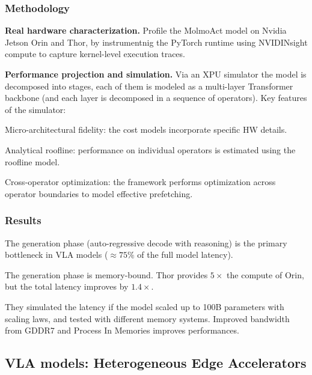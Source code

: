 \subsubsection{Methodology}
\begin{dashlist}
    \item \textbf{Real hardware characterization.} Profile the MolmoAct model on Nvidia Jetson Orin and Thor, by instrumentnig the PyTorch runtime using NVIDINsight compute to capture kernel-level execution traces.
    \item \textbf{Performance projection and simulation.} Via an XPU simulator the model is decomposed into stages, each of them is modeled as a multi-layer Transformer backbone (and each layer is decomposed in a sequence of operators). Key features of the simulator:
    \begin{dashlist}
        \item Micro-architectural fidelity: the cost models incorporate specific HW details.
        \item Analytical roofline: performance on individual operators is estimated using the roofline model.
        \item Cross-operator optimization: the framework performs optimization across operator boundaries to model effective prefetching.
    \end{dashlist}
\end{dashlist}

\subsubsection{Results}
\begin{dashlist}
    \item The generation phase (auto-regressive decode with reasoning) is the primary bottleneck in VLA models ($\approx75\%$ of the full model latency).
    \item The generation phase is memory-bound. Thor provides $5\times$ the compute of Orin, but the total latency improves by $1.4\times$.
    \item They simulated the latency if the model scaled up to 100B parameters with scaling laws, and tested with different memory systems. Improved bandwidth from GDDR7 and Process In Memories improves performances.
\end{dashlist}

\subsection{VLA models: Heterogeneous Edge Accelerators}
\label{subsec:vla-heterogeneous}

